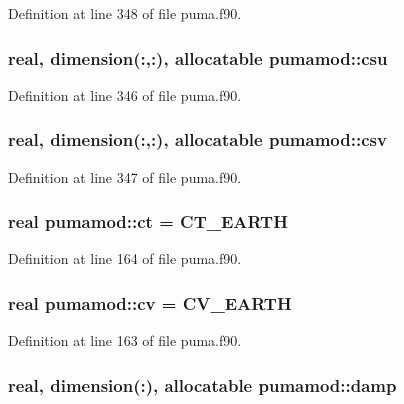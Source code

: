 \-Definition at line 348 of file puma.\-f90.

\hypertarget{classpumamod_a9dbdc63a5f305db50a26a47cc34d00c7}{
\subsubsection[{csu}]{\setlength{\rightskip}{0pt plus 5cm}real, dimension(\-:,\-:), allocatable {\bf pumamod\-::csu}}}
\label{classpumamod_a9dbdc63a5f305db50a26a47cc34d00c7}


\-Definition at line 346 of file puma.\-f90.

\hypertarget{classpumamod_a3ab8cd6714b1bbb4233200b9acba2904}{
\subsubsection[{csv}]{\setlength{\rightskip}{0pt plus 5cm}real, dimension(\-:,\-:), allocatable {\bf pumamod\-::csv}}}
\label{classpumamod_a3ab8cd6714b1bbb4233200b9acba2904}


\-Definition at line 347 of file puma.\-f90.

\hypertarget{classpumamod_a7a6d067e0dfb359595d82114a0362ff2}{
\subsubsection[{ct}]{\setlength{\rightskip}{0pt plus 5cm}real {\bf pumamod\-::ct} = \-C\-T\-\_\-\-E\-A\-R\-T\-H}}
\label{classpumamod_a7a6d067e0dfb359595d82114a0362ff2}


\-Definition at line 164 of file puma.\-f90.

\hypertarget{classpumamod_a565ac5e5bafeaa6e81c64ce72e63ccf1}{
\subsubsection[{cv}]{\setlength{\rightskip}{0pt plus 5cm}real {\bf pumamod\-::cv} = \-C\-V\-\_\-\-E\-A\-R\-T\-H}}
\label{classpumamod_a565ac5e5bafeaa6e81c64ce72e63ccf1}


\-Definition at line 163 of file puma.\-f90.

\hypertarget{classpumamod_a4c165b031088a68ae36d654a5763aef8}{
\subsubsection[{damp}]{\setlength{\rightskip}{0pt plus 5cm}real, dimension(\-:), allocatable {\bf pumamod\-::damp}}}
\label{classpumamod_a4c165b031088a68ae36d654a5763aef8}


